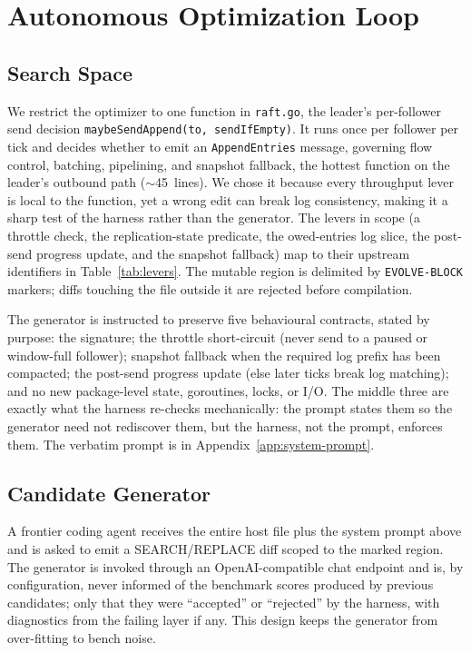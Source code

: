 \documentclass{article}
\begin{document}
\section{Autonomous Optimization Loop}
\label{sec:loop}

\subsection{Search Space}
We restrict the optimizer to one function in \texttt{raft.go}, the
leader's per-follower send decision
\texttt{maybeSendAppend(to, sendIfEmpty)}. It runs once per follower
per tick and decides whether to emit an \texttt{AppendEntries}
message, governing flow control, batching, pipelining, and snapshot
fallback, the hottest function on the leader's outbound path
($\sim$45~lines). We chose it because every throughput lever is local
to the function, yet a wrong edit can break log consistency, making it
a sharp test of the harness rather than the generator. The levers in
scope (a throttle check, the replication-state predicate, the
owed-entries log slice, the post-send progress update, and the
snapshot fallback) map to their upstream identifiers in
Table~\ref{tab:levers}. The mutable region is delimited by
\texttt{EVOLVE-BLOCK} markers; diffs touching the file outside it are
rejected before compilation.

The generator is instructed to preserve five behavioural contracts,
stated by purpose: the signature; the throttle short-circuit (never
send to a paused or window-full follower); snapshot fallback when the
required log prefix has been compacted; the post-send progress update
(else later ticks break log matching); and no new package-level state,
goroutines, locks, or I/O. The middle three are exactly what the
harness re-checks mechanically: the prompt states them so the
generator need not rediscover them, but the harness, not the prompt,
enforces them. The verbatim prompt is in
Appendix~\ref{app:system-prompt}.

\subsection{Candidate Generator}
A frontier coding agent receives the entire host file plus the
system prompt above and is asked to emit a SEARCH/REPLACE diff scoped
to the marked region. The generator is invoked through an
OpenAI-compatible chat endpoint and is, by configuration, never
informed of the benchmark scores produced by previous candidates;
only that they were ``accepted'' or ``rejected'' by the harness, with
diagnostics from the failing layer if any. This design keeps the
generator from over-fitting to bench noise.
\end{document}

